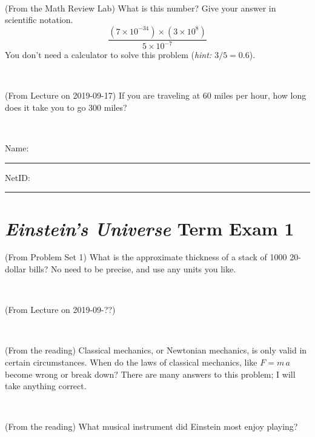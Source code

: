 \documentclass[12pt, letterpaper]{article}
\begin{document}
\vfill ~

\begin{problem} (From the Math Review Lab)
What is this number? Give your answer in scientific notation.
$$
\frac{(7\times10^{-34})\times(3\times10^8)}{5\times10^{-7}}
$$
You don't need a calculator to solve this problem (\textit{hint: $3/5=0.6$}).
\end{problem}


\vfill ~

\begin{problem} (From Lecture on 2019-09-17)
If you are traveling at 60 miles per hour, how long does
it take you to go 300 miles?
\end{problem}


\vfill ~


\cleardoublepage



\noindent
Name: \rule[-1ex]{0.60\textwidth}{0.1pt}
NetID: \rule[-1ex]{0.20\textwidth}{0.1pt}

\section*{\textsl{Einstein's Universe} Term Exam 1}
\setcounter{problem}{1}


\begin{problem} (From Problem Set 1)
What is the approximate thickness of a stack of 1000 20-dollar bills?
No need to be precise, and use any units you like.
\end{problem}


\vfill ~

\begin{problem} (From Lecture on 2019-09-??)
\end{problem}


\vfill ~

\begin{problem} (From the reading)
Classical mechanics, or Newtonian mechanics, is only valid in certain
circumstances. When do the laws of classical mechanics, like $F =
m\,a$ become wrong or break down? There are many answers to this
problem; I will take anything correct.
\end{problem}


\vfill ~

\begin{problem} (From the reading)
What musical instrument did Einstein most enjoy playing?
\end{problem}


\vfill ~
\end{document}
